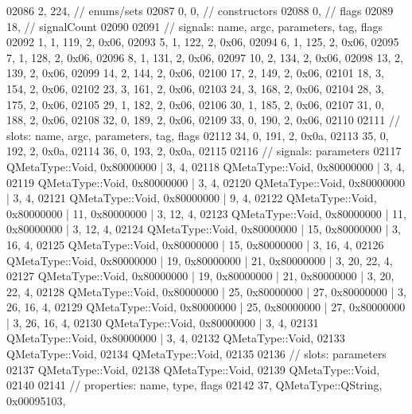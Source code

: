\begin{DoxyCode}
02086        2,  224, \textcolor{comment}{// enums/sets}
02087        0,    0, \textcolor{comment}{// constructors}
02088        0,       \textcolor{comment}{// flags}
02089       18,       \textcolor{comment}{// signalCount}
02090 
02091  \textcolor{comment}{// signals: name, argc, parameters, tag, flags}
02092        1,    1,  119,    2, 0x06,
02093        5,    1,  122,    2, 0x06,
02094        6,    1,  125,    2, 0x06,
02095        7,    1,  128,    2, 0x06,
02096        8,    1,  131,    2, 0x06,
02097       10,    2,  134,    2, 0x06,
02098       13,    2,  139,    2, 0x06,
02099       14,    2,  144,    2, 0x06,
02100       17,    2,  149,    2, 0x06,
02101       18,    3,  154,    2, 0x06,
02102       23,    3,  161,    2, 0x06,
02103       24,    3,  168,    2, 0x06,
02104       28,    3,  175,    2, 0x06,
02105       29,    1,  182,    2, 0x06,
02106       30,    1,  185,    2, 0x06,
02107       31,    0,  188,    2, 0x06,
02108       32,    0,  189,    2, 0x06,
02109       33,    0,  190,    2, 0x06,
02110 
02111  \textcolor{comment}{// slots: name, argc, parameters, tag, flags}
02112       34,    0,  191,    2, 0x0a,
02113       35,    0,  192,    2, 0x0a,
02114       36,    0,  193,    2, 0x0a,
02115 
02116  \textcolor{comment}{// signals: parameters}
02117     QMetaType::Void, 0x80000000 | 3,    4,
02118     QMetaType::Void, 0x80000000 | 3,    4,
02119     QMetaType::Void, 0x80000000 | 3,    4,
02120     QMetaType::Void, 0x80000000 | 3,    4,
02121     QMetaType::Void, 0x80000000 | 9,    4,
02122     QMetaType::Void, 0x80000000 | 11, 0x80000000 | 3,   12,    4,
02123     QMetaType::Void, 0x80000000 | 11, 0x80000000 | 3,   12,    4,
02124     QMetaType::Void, 0x80000000 | 15, 0x80000000 | 3,   16,    4,
02125     QMetaType::Void, 0x80000000 | 15, 0x80000000 | 3,   16,    4,
02126     QMetaType::Void, 0x80000000 | 19, 0x80000000 | 21, 0x80000000 | 3,   20,   22,    4,
02127     QMetaType::Void, 0x80000000 | 19, 0x80000000 | 21, 0x80000000 | 3,   20,   22,    4,
02128     QMetaType::Void, 0x80000000 | 25, 0x80000000 | 27, 0x80000000 | 3,   26,   16,    4,
02129     QMetaType::Void, 0x80000000 | 25, 0x80000000 | 27, 0x80000000 | 3,   26,   16,    4,
02130     QMetaType::Void, 0x80000000 | 3,    4,
02131     QMetaType::Void, 0x80000000 | 3,    4,
02132     QMetaType::Void,
02133     QMetaType::Void,
02134     QMetaType::Void,
02135 
02136  \textcolor{comment}{// slots: parameters}
02137     QMetaType::Void,
02138     QMetaType::Void,
02139     QMetaType::Void,
02140 
02141  \textcolor{comment}{// properties: name, type, flags}
02142       37, QMetaType::QString, 0x00095103,

\end{DoxyCode}
